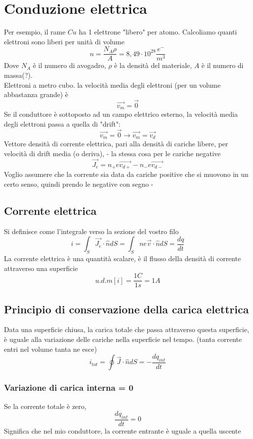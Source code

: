 \documentclass[a4paper]{report}
\begin{document}
  \section{Conduzione elettrica}
  Per esempio, il rame $Cu$ ha 1 elettrone "libero" per atomo. Calcoliamo quanti elettroni sono liberi per unità di volume
  $$ n = \frac{N_A \rho}{ A} = 8,49 \cdot 10^{28} \frac{e^-}{m^3} $$
  Dove $N_A$ è il numero di avogadro, $\rho$ è la densità del materiale, $A$ è il numero di massa(?).\\
  Elettroni a metro cubo. la velocità media degli elettroni (per un volume abbastanza grande) è
  $$\vec{v_m} = \vec{0}$$
  Se il conduttore è sottoposto ad un campo elettrico esterno, la velocità media degli elettroni passa a quella di "drift":
  $$ \vec{v_m} = \vec{0} \longrightarrow \vec{v_m} = \vec{v_d} $$
  Vettore densità di corrente elettrica, pari alla densità di cariche libere, per velocità di drift media (o deriva), - la stessa cosa per le cariche negative
  $$ \vec{J_e} = n_+ e \vec{v_{d+}} - n_- e \vec{v_{d-}}$$
  Voglio assumere che la corrente sia data da cariche positive che si muovono in un certo senso, quindi prendo le negative con segno -

  \subsection{Corrente elettrica}
  Si definisce come l'integrale verso la sezione del vostro filo
  $$ i = \int_S \vec{J_e} \cdot \hat{n} dS = \int_S n e \vec{v} \cdot \hat{n} dS = \frac{dq}{dt}$$
  La corrente elettrica è una quantità scalare, è il flusso della densità di corrente attraverso una superficie
  $$ u.d.m[i]=\frac{1C}{1s}= 1A $$

  \subsection{Principio di conservazione della carica elettrica}
  Data una superficie chiusa, la carica totale che passa attraverso questa superficie, è uguale alla variazione delle cariche nella superficie nel tempo. (tanta corrente entri nel volume tanta ne esce)
  $$ i_{tot} = \oint \vec{J} \cdot \hat{n} dS = -\frac{dq_{int}}{dt} $$
  \subsubsection{Variazione di carica interna = 0}
  Se la corrente totale è zero,
  $$\frac{dq_{int}}{dt} = 0$$
  Significa che nel mio conduttore, la corrente entrante è uguale a quella uscente
\end{document}
